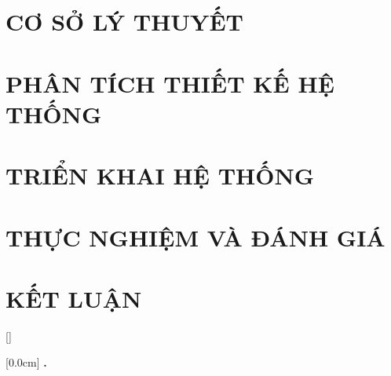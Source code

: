 \documentclass[a4paper,13pt,3p,twoside]{report}
\theoremstyle{definition}
\begin{document}
\newpage
\chapter{CƠ SỞ LÝ THUYẾT}
\label{chapter:Related_works}


\newpage
\chapter{PHÂN TÍCH THIẾT KẾ HỆ THỐNG}
\label{chapter:Design}


\newpage
\chapter{TRIỂN KHAI HỆ THỐNG}
\label{chapter:Implementation}


\newpage
\chapter{THỰC NGHIỆM VÀ ĐÁNH GIÁ}
\label{chapter:Experiment}


\newpage
\chapter*{KẾT LUẬN}


\newpage
\printbibliography[heading=bibintoc, title={TÀI LIỆU THAM KHẢO}]

\appendixpage
\appendices
\addappheadtotoc

[]
\titlespacing*{\chapter}{0pt}{-20pt}{20pt}

    [0.0cm] %
    {\bfseries\vspace{0.3cm}} %
    {{\bfseries{\scshape} \thecontentslabel.\ }} %
    {} %
    {\contentspage} %

\end{document}
